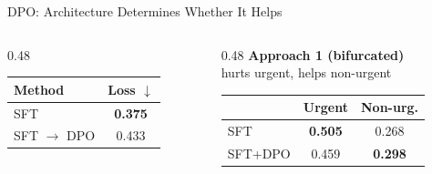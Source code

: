 \documentclass{beamer}
\begin{document}
\begin{frame}{DPO: Architecture Determines Whether It Helps}
\begin{columns}[T]
\begin{column}{0.48\textwidth}
        \scriptsize
        \begin{tabular}{lc}
            \toprule
            \textbf{Method} & \textbf{Loss $\downarrow$} \\
            \midrule
            SFT & \textbf{0.375} \\
            SFT $\to$ DPO & \textcolor{red!70!black}{0.433} \\
            \bottomrule
        \end{tabular}
    \end{column}
    \pause
    \begin{column}{0.48\textwidth}
        \centering
        \textbf{Approach 1 (bifurcated)} \\
        \footnotesize \textcolor{red!70!black}{hurts urgent}, \textcolor{green!50!black}{helps non-urgent}
        \vspace{0.3em}
        
        \scriptsize
        \begin{tabular}{lcc}
            \toprule
            & \textbf{Urgent} & \textbf{Non-urg.} \\
            \midrule
            SFT & \textbf{0.505} & 0.268 \\
            SFT+DPO & \textcolor{red!70!black}{0.459} & \textcolor{green!50!black}{\textbf{0.298}} \\
            \bottomrule
        \end{tabular}
    \end{column}
\end{columns} 
\end{frame} 


\end{document}
